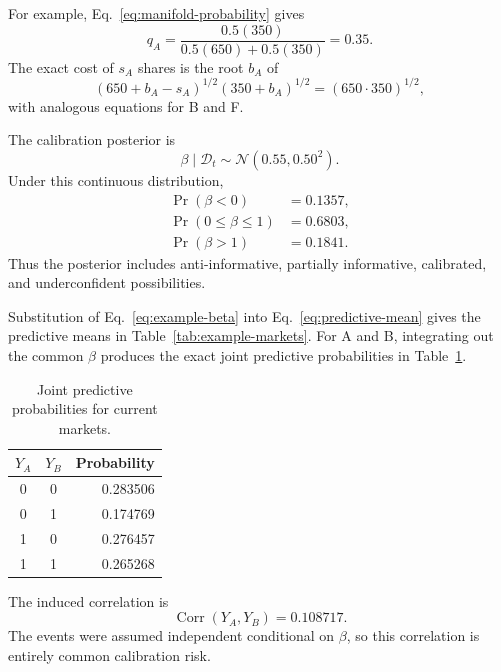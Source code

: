 \documentclass[journal, a4paper]{IEEEtran}
\begin{document}
For example, Eq.~\eqref{eq:manifold-probability} gives
\begin{equation}
q_A
=
\frac{0.5(350)}{0.5(650)+0.5(350)}
=0.35.
\end{equation}
The exact cost of $s_A$ shares is the root $b_A$ of
\begin{equation}
(650+b_A-s_A)^{1/2}(350+b_A)^{1/2}
=(650\cdot350)^{1/2},
\label{eq:example-A-cost}
\end{equation}
with analogous equations for B and F.

The calibration posterior is
\begin{equation}
\beta\mid\mathcal{D}_t
\sim
\mathcal{N}(0.55,0.50^2).
\label{eq:example-beta}
\end{equation}
Under this continuous distribution,
\begin{align}
\Pr(\beta<0)&=0.1357,\\
\Pr(0\leq\beta\leq1)&=0.6803,\\
\Pr(\beta>1)&=0.1841.
\end{align}
Thus the posterior includes anti-informative, partially informative, calibrated, and underconfident possibilities.

Substitution of Eq.~\eqref{eq:example-beta} into Eq.~\eqref{eq:predictive-mean} gives the predictive means in Table~\ref{tab:example-markets}. For A and B, integrating out the common $\beta$ produces the exact joint predictive probabilities in Table~\ref{tab:joint-probs}.

\begin{table}[!t]
\centering
\caption{Joint predictive probabilities for current markets.}
\label{tab:joint-probs}
\begin{tabular}{@{}ccr@{}}
\toprule
$Y_A$ & $Y_B$ & Probability\\
\midrule
0 & 0 & 0.283506\\
0 & 1 & 0.174769\\
1 & 0 & 0.276457\\
1 & 1 & 0.265268\\
\bottomrule
\end{tabular}
\end{table}

The induced correlation is
\begin{equation}
\operatorname{Corr}(Y_A,Y_B)=0.108717.
\end{equation}
The events were assumed independent conditional on $\beta$, so this correlation is entirely common calibration risk.
\end{document}
